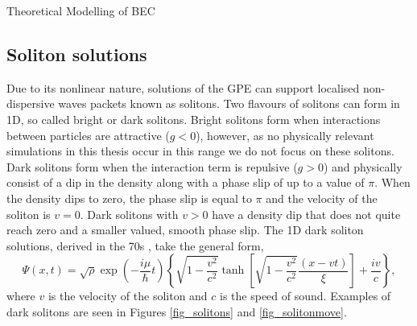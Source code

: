 \begin{chapter}{\label{cha:theoretical_model}Theoretical Modelling of BEC}
	\subsection{\label{section:soliton} Soliton solutions}
	Due to its nonlinear nature, solutions of the GPE can support localised non-dispersive waves packets known as solitons. Two flavours of solitons can form in 1D, so called bright or dark solitons. Bright solitons form when interactions between particles are attractive ($g<0$), however, as no physically relevant simulations in this thesis occur in this range we do not focus on these solitons. Dark solitons form when the interaction term is repulsive ($g>0$) and physically consist of a dip in the density along with a phase slip of up to a value of $\pi$. When the density dips to zero, the phase slip is equal to $\pi$ and the velocity of the soliton is $v=0$. Dark solitons with $v>0$ have a density dip that does not quite reach zero and a smaller valued, smooth phase slip. The 1D dark soliton solutions, derived in the 70s \cite{zakharov72,zakharov73}, take the general form,
	\begin{equation}
		\Psi(x,t) = \sqrt{\rho}\exp\left(-\frac{i\mu}{\hbar}t\right)\left\{ \sqrt{1-\frac{v^2}{c^2}} \tanh\left[ \sqrt{1-\frac{v^2}{c^2}}\frac{(x-vt)}{\xi} \right ] + \frac{iv}{c}  \right \} ,
	\end{equation}
	where $v$ is the velocity of the soliton and $c$ is the speed of sound. Examples of dark solitons are seen in Figures \ref{fig_solitons} and \ref{fig_solitonmove}.
	\begin{figure}[!ht]
	\centering
\end{figure}
\end{chapter}
